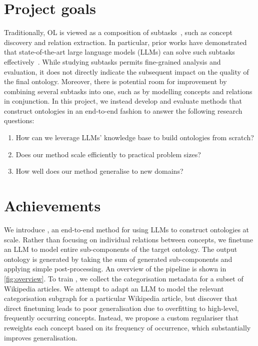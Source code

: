 \section{Project goals}

Traditionally, OL is viewed as a composition of subtasks~\cite{asim2018survey}, such as concept discovery and relation extraction. In particular, prior works have demonstrated that state-of-the-art large language models (LLMs) can solve such subtasks effectively~\cite{babaei2023llms4ol}. While studying subtasks permits fine-grained analysis and evaluation, it does not directly indicate the subsequent impact on the quality of the final ontology. Moreover, there is potential room for improvement by combining several subtasks into one, such as by modelling concepts and relations in conjunction. In this project, we instead develop and evaluate methods that construct ontologies in an end-to-end fashion to answer the following research questions:
\begin{enumerate}[leftmargin=*]
    \item How can we leverage LLMs' knowledge base to build ontologies from scratch?
    \item Does our method scale efficiently to practical problem sizes?
    \item How well does our method generalise to new domains?
\end{enumerate}

\section{Achievements}



We introduce \name, an end-to-end method for using LLMs to construct ontologies at scale. Rather than focusing on individual relations between concepts, we finetune an LLM to model entire sub-components of the target ontology. The output ontology is generated by taking the sum of generated sub-components and applying simple post-processing. An overview of the pipeline is shown in \cref{fig:overview}. To train \name, we collect the categorisation metadata for a subset of Wikipedia articles. We attempt to adapt an LLM to model the relevant categorisation subgraph for a particular Wikipedia article, but discover that direct finetuning leads to poor generalisation due to overfitting to high-level, frequently occurring concepts. Instead, we propose a custom regulariser that reweights each concept based on its frequency of occurrence, which substantially improves generalisation.


